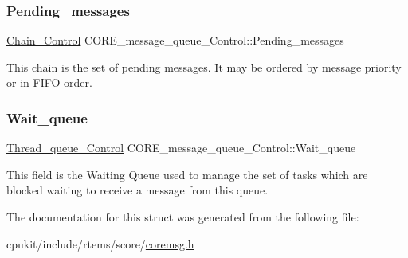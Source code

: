 \subsubsection{\texorpdfstring{Pending\_messages}{Pending\_messages}}
{\footnotesize\ttfamily \mbox{\hyperlink{unionChain__Control}{Chain\+\_\+\+Control}} C\+O\+R\+E\+\_\+message\+\_\+queue\+\_\+\+Control\+::\+Pending\+\_\+messages}

This chain is the set of pending messages. It may be ordered by message priority or in F\+I\+FO order. \mbox{\label{structCORE__message__queue__Control_abc0cfb9192140c3121e492f62e3f9ce3}} 
\subsubsection{\texorpdfstring{Wait\_queue}{Wait\_queue}}
{\footnotesize\ttfamily \mbox{\hyperlink{structThread__queue__Control}{Thread\+\_\+queue\+\_\+\+Control}} C\+O\+R\+E\+\_\+message\+\_\+queue\+\_\+\+Control\+::\+Wait\+\_\+queue}

This field is the Waiting Queue used to manage the set of tasks which are blocked waiting to receive a message from this queue. 

The documentation for this struct was generated from the following file\+:\begin{DoxyCompactItemize}
\item 
cpukit/include/rtems/score/\mbox{\hyperlink{coremsg_8h}{coremsg.\+h}}\end{DoxyCompactItemize}
